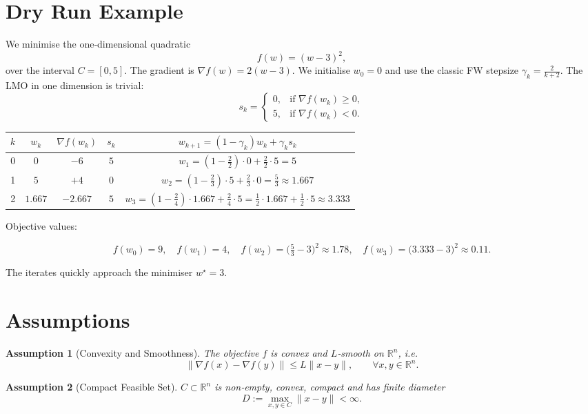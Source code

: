 \documentclass{article}
\newtheorem{assumption}{Assumption}
\begin{document}
\section*{Dry Run Example}
We minimise the one‑dimensional quadratic 
\[
f(w)=(w-3)^2,
\]
over the interval $C=[0,5]$.
The gradient is $\nabla f(w)=2(w-3)$.  
We initialise $w_0=0$ and use the classic FW stepsize $\gamma_k=\frac{2}{k+2}$.
The LMO in one dimension is trivial:
\[
s_k=
\begin{cases}
0, & \text{if } \nabla f(w_k)\ge 0,\\[2pt]
5, & \text{if } \nabla f(w_k)<0 .
\end{cases}
\]

\begin{center}
\begin{tabular}{c|c|c|c|c}
$k$ & $w_k$ & $\nabla f(w_k)$ & $s_k$ & $w_{k+1}= (1-\gamma_k)w_k+\gamma_k s_k$\\ \hline
0 & $0$ & $-6$ & $5$ & $\displaystyle w_1=(1-\tfrac{2}{2})\cdot0+\tfrac{2}{2}\cdot5=5$ \\[6pt]
1 & $5$ & $+4$ & $0$ & $\displaystyle w_2=(1-\tfrac{2}{3})\cdot5+\tfrac{2}{3}\cdot0=\frac{5}{3}\approx1.667$ \\[6pt]
2 & $1.667$ & $-2.667$ & $5$ & $\displaystyle w_3=(1-\tfrac{2}{4})\cdot1.667+\tfrac{2}{4}\cdot5= \frac{1}{2}\cdot1.667+ \frac{1}{2}\cdot5\approx3.333$
\end{tabular}
\end{center}

Objective values:

\[
f(w_0)=9,\quad f(w_1)=4,\quad f(w_2)=\bigl(\tfrac{5}{3}-3\bigr)^2\approx1.78,\quad 
f(w_3)=\bigl(3.333-3\bigr)^2\approx0.11 .
\]

The iterates quickly approach the minimiser $w^\star=3$.

\section*{Assumptions}
\begin{assumption}[Convexity and Smoothness]
\label{as:convex-smooth}
The objective $f$ is convex and $L$‑smooth on $\mathbb{R}^n$, i.e.
\[
\|\nabla f(x)-\nabla f(y)\| \le L\|x-y\|,\qquad\forall x,y\in\mathbb{R}^n .
\]
\end{assumption}

\begin{assumption}[Compact Feasible Set]
\label{as:compact}
$C\subset\mathbb{R}^n$ is non‑empty, convex, compact and has finite diameter
\[
D:=\max_{x,y\in C}\|x-y\|<\infty .
\]
\end{assumption}
\end{document}
